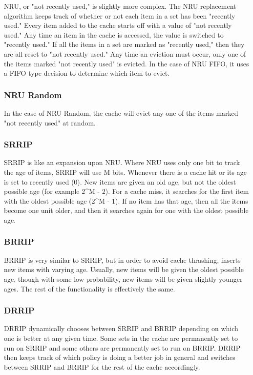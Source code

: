 NRU, or "not recently used," is slightly more complex.  The NRU replacement algorithm keeps track of whether or not each item in a set has been "recently used."  Every item added to the cache starts off with a value of "not recently used."  Any time an item in the cache is accessed, the value is switched to "recently used."  If all the items in a set are marked as "recently used," then they are all reset to "not recently used."  Any time an eviction must occur, only one of the items marked "not recently used" is evicted.  In the case of NRU FIFO, it uses a FIFO type decision to determine which item to evict.

\subsubsection{NRU Random}

In the case of NRU Random, the cache will evict any one of the items marked "not recently used" at random.

\subsubsection{SRRIP}

SRRIP is like an expansion upon NRU.  Where NRU uses only one bit to track the age of items, SRRIP will use M bits.  Whenever there is a cache hit or its age is set to recently used (0).  New items are given an old age, but not the oldest possible age (for example 2^M - 2).  For a cache miss, it searches for the first item with the oldest possible age (2^M - 1).  If no item has that age, then all the items become one unit older, and then it searches again for one with the oldest possible age.

\subsubsection{BRRIP}

BRRIP is very similar to SRRIP, but in order to avoid cache thrashing, inserts new items with varying age.  Usually, new items will be given the oldest possible age, though with some low probability, new items will be given slightly younger ages.  The rest of the functionality is effectively the same.

\subsubsection{DRRIP}

DRRIP dynamically chooses between SRRIP and BRRIP depending on which one is better at any given time.  Some sets in the cache are permanently set to run on SRRIP and some others are permanently set to run on BRRIP.  DRRIP then keeps track of which policy is doing a better job in general and switches between SRRIP and BRRIP for the rest of the cache accordingly.

